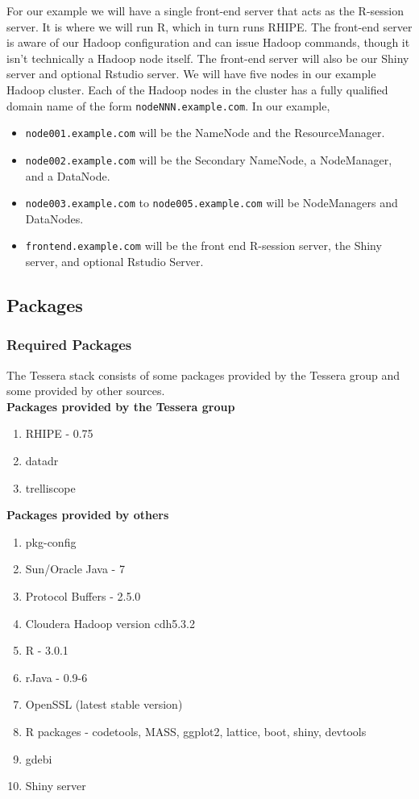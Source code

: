 For our example we will have a single front-end server that acts as the
R-session server.  It is where we will run R, which in turn runs RHIPE.
The front-end server is aware of our Hadoop configuration and can issue
Hadoop commands, though it isn't technically a Hadoop node itself. The
front-end server will also be our Shiny server and optional Rstudio
server.  We will have five nodes in our example Hadoop cluster.  Each of
the Hadoop nodes in the cluster has a fully qualified domain
name of the form \verb|nodeNNN.example.com|. In our example,

\begin{itemize}
\item \verb|node001.example.com| will be the NameNode and the ResourceManager.
\item \verb|node002.example.com| will be the Secondary NameNode, a NodeManager, and a DataNode. 
\item \verb|node003.example.com| to \verb|node005.example.com| will be NodeManagers and DataNodes. 
\item \verb|frontend.example.com| will be the front end R-session server, the Shiny server, and optional Rstudio Server.
\end{itemize}

\subsection{Packages}
\subsubsection{Required Packages}
The Tessera stack consists of some packages provided by the Tessera group and some provided by other sources. \\

\textbf{Packages provided by the Tessera group}
\begin{enumerate}
\item RHIPE - 0.75
\item datadr
\item trelliscope
\end{enumerate}
\textbf{Packages provided by others}
\begin{enumerate}
\item pkg-config
\item Sun/Oracle Java - 7
\item Protocol Buffers - 2.5.0 
\item Cloudera Hadoop version cdh5.3.2
\item R - 3.0.1
\item rJava - 0.9-6 
\item OpenSSL (latest stable version)
\item R packages - codetools, MASS, ggplot2, lattice, boot, shiny, devtools
\item gdebi
\item Shiny server
\end{enumerate}

